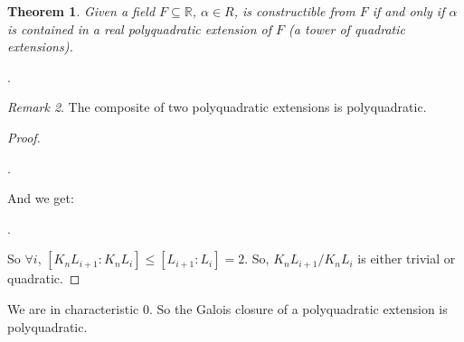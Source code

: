 \documentclass[9pt,reqno,twoside]{amsbook}
\theoremstyle{plain}
\newtheorem{theorem}{Theorem}[chapter]
\numberwithin{section}{chapter}
\numberwithin{equation}{chapter}
\theoremstyle{definition}
\theoremstyle{remark}
\newtheorem{rem}[theorem]{Remark}
\theoremstyle{plain}
\newcommand{\sub}{\subseteq}
\newcommand{\R}{\mathbb{R}}
\renewcommand{\leq}{\leqslant}
\begin{document}
\begin{theorem}
Given a field $F \sub \R$, $\alpha \in R$, is constructible from $F$ if and only if $\alpha$ is contained in a real polyquadratic extension of $F$ (a tower of quadratic extensions). 
\end{theorem}

\begin{center}
.
\end{center}

\begin{rem}
The composite of two polyquadratic extensions is polyquadratic. 
\end{rem}

\begin{proof}


\begin{center}
.
\end{center}
And we get:
\begin{center}
.
\end{center}
So $\forall i$, $[K_nL_{i + 1}:K_nL_i] \leq [L_{i + 1}:L_i] = 2$. So, $K_nL_{i + 1}/K_nL_i$ is either trivial or quadratic. 
\end{proof}

We are in characteristic 0. So the Galois closure of a polyquadratic extension is polyquadratic. 
\end{document}
